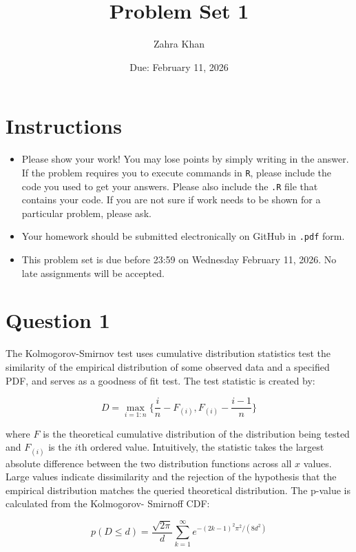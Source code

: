\documentclass[12pt,letterpaper]{article}
\title{Problem Set 1}
\date{Due: February 11, 2026}
\author{Zahra Khan}
\begin{document}
	\maketitle
	\section*{Instructions}
	\begin{itemize}
	\item Please show your work! You may lose points by simply writing in the answer. If the problem requires you to execute commands in \texttt{R}, please include the code you used to get your answers. Please also include the \texttt{.R} file that contains your code. If you are not sure if work needs to be shown for a particular problem, please ask.
\item Your homework should be submitted electronically on GitHub in \texttt{.pdf} form.
\item This problem set is due before 23:59 on Wednesday February 11, 2026. No late assignments will be accepted.
	\end{itemize}

	\vspace{.25cm}
\section*{Question 1} 
\vspace{.25cm}
\noindent The Kolmogorov-Smirnov test uses cumulative distribution statistics test the similarity of the empirical distribution of some observed data and a specified PDF, and serves as a goodness of fit test. The test statistic is created by:

$$D = \max_{i=1:n} \Big\{ \frac{i}{n}  - F_{(i)}, F_{(i)} - \frac{i-1}{n} \Big\}$$

\noindent where $F$ is the theoretical cumulative distribution of the distribution being tested and $F_{(i)}$ is the $i$th ordered value. Intuitively, the statistic takes the largest absolute difference between the two distribution functions across all $x$ values. Large values indicate dissimilarity and the rejection of the hypothesis that the empirical distribution matches the queried theoretical distribution. The p-value is calculated from the Kolmogorov-
Smirnoff CDF:

$$p(D \leq d)= \frac{\sqrt {2\pi}}{d} \sum _{k=1}^{\infty }e^{-(2k-1)^{2}\pi ^{2}/(8d^{2})}$$
\end{document}
